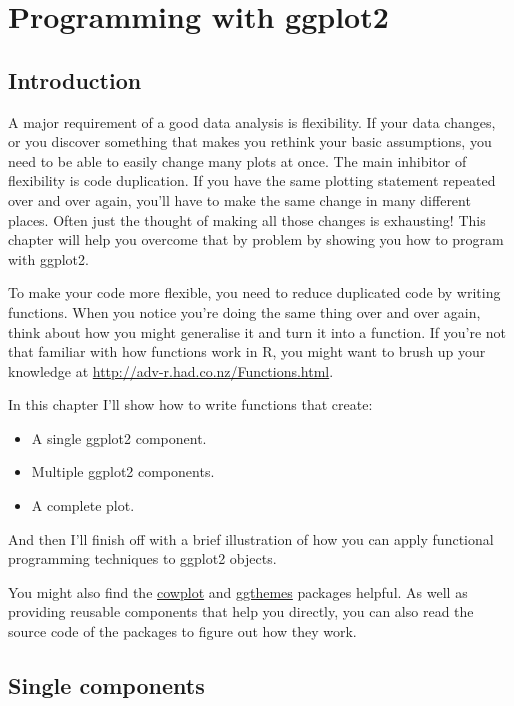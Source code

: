 \chapter{Programming with ggplot2}\label{cha:programming}

\section{Introduction}

A major requirement of a good data analysis is flexibility. If your data
changes, or you discover something that makes you rethink your basic
assumptions, you need to be able to easily change many plots at once.
The main inhibitor of flexibility is code duplication. If you have the
same plotting statement repeated over and over again, you'll have to
make the same change in many different places. Often just the thought of
making all those changes is exhausting! This chapter will help you
overcome that by problem by showing you how to program with ggplot2.

To make your code more flexible, you need to reduce duplicated code by
writing functions. When you notice you're doing the same thing over and
over again, think about how you might generalise it and turn it into a
function. If you're not that familiar with how functions work in R, you
might want to brush up your knowledge at
\url{http://adv-r.had.co.nz/Functions.html}.

In this chapter I'll show how to write functions that create:

\begin{itemize}
\tightlist
\item
  A single ggplot2 component.
\item
  Multiple ggplot2 components.
\item
  A complete plot.
\end{itemize}

And then I'll finish off with a brief illustration of how you can apply
functional programming techniques to ggplot2 objects.

You might also find the
\href{https://github.com/wilkelab/cowplot}{cowplot} and
\href{https://github.com/jrnold/ggthemes}{ggthemes} packages helpful. As
well as providing reusable components that help you directly, you can
also read the source code of the packages to figure out how they work.

\section{Single components}


